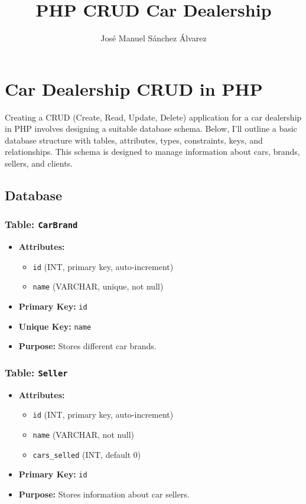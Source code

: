 \documentclass[11pt]{article}
\author{José Manuel Sánchez Álvarez}
\date{}
\title{PHP CRUD Car Dealership}
\begin{document}
\maketitle
\setcounter{tocdepth}{3}
\tableofcontents

\setlength\parindent{10pt}

\section{Car Dealership CRUD in PHP}
\label{sec:org5a9b2ab}
Creating a CRUD (Create, Read, Update, Delete) application for a car
dealership in PHP involves designing a suitable database schema. Below,
I'll outline a basic database structure with tables, attributes, types,
constraints, keys, and relationships. This schema is designed to manage
information about cars, brands, sellers, and clients.

\subsection{Database}
\label{sec:org281fe6d}
\subsubsection{Table: \texttt{CarBrand}}
\label{sec:org53ed497}
\begin{itemize}
\item \textbf{Attributes:}

\begin{itemize}
\item \texttt{id} (INT, primary key, auto-increment)
\item \texttt{name} (VARCHAR, unique, not null)
\end{itemize}

\item \textbf{Primary Key:} \texttt{id}
\item \textbf{Unique Key:} \texttt{name}
\item \textbf{Purpose:} Stores different car brands.
\end{itemize}

\subsubsection{Table: \texttt{Seller}}
\label{sec:orgd161478}
\begin{itemize}
\item \textbf{Attributes:}

\begin{itemize}
\item \texttt{id} (INT, primary key, auto-increment)
\item \texttt{name} (VARCHAR, not null)
\item \texttt{cars\_selled} (INT, default 0)
\end{itemize}

\item \textbf{Primary Key:} \texttt{id}
\item \textbf{Purpose:} Stores information about car sellers.
\end{itemize}
\end{document}
